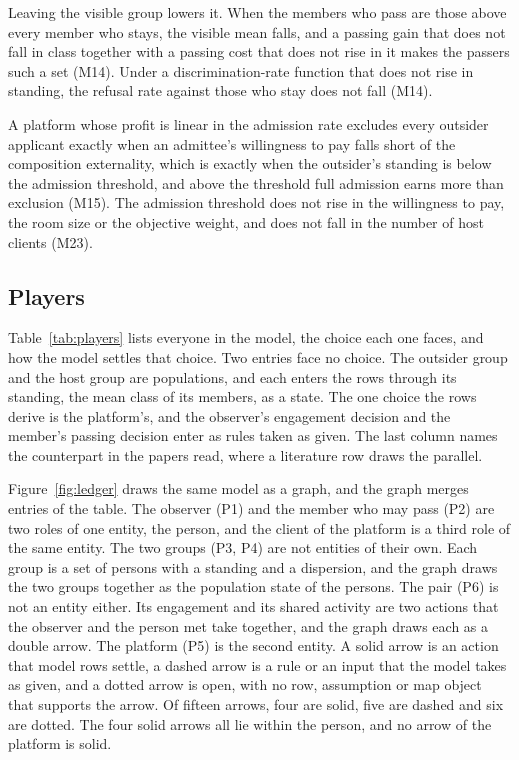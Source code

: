 Leaving the visible group lowers it. When the members who pass are those
above every member who stays, the visible mean falls, and a passing gain
that does not fall in class together with a passing cost that does not rise
in it makes the passers such a set (M14). Under a discrimination-rate
function that does not rise in standing, the refusal rate against those who
stay does not fall (M14).

A platform whose profit is linear in the admission rate excludes every
outsider applicant exactly when an admittee's willingness to pay falls short
of the composition externality, which is exactly when the outsider's
standing is below the admission threshold, and above the threshold full
admission earns more than exclusion (M15). The admission threshold does not rise in
the willingness to pay, the room size or the objective weight, and does not
fall in the number of host clients (M23).

\subsection{Players}
\label{sec:players}

Table~\ref{tab:players} lists everyone in the model, the choice each one
faces, and how the model settles that choice. Two entries face no choice.
The outsider group and the host group are populations, and each enters the
rows through its standing, the mean class of its members, as a state. The
one choice the rows derive is the platform's, and the observer's engagement
decision and the member's passing decision enter as rules taken as given.
The last column names the counterpart in the papers read, where a
literature row draws the parallel.

Figure~\ref{fig:ledger} draws the same model as a graph, and the graph merges
entries of the table. The observer (P1) and the member who may pass (P2) are
two roles of one entity, the person, and the client of the platform is a
third role of the same entity. The two groups (P3, P4) are not entities of
their own. Each group is a set of persons with a standing and a dispersion, and
the graph draws the two groups together as the population state of the
persons. The pair (P6) is not an
entity either. Its engagement and its shared activity are two actions that
the observer and the person met take together, and the graph draws each as a
double arrow. The platform (P5) is the second entity. A solid arrow is an
action that model rows settle, a dashed arrow is a rule or an input that the
model takes as given, and a dotted arrow is open, with no row, assumption or
map object that supports the arrow. Of fifteen arrows, four are solid, five
are dashed and six are dotted. The four solid arrows all lie within the
person, and no arrow of the platform is solid.

